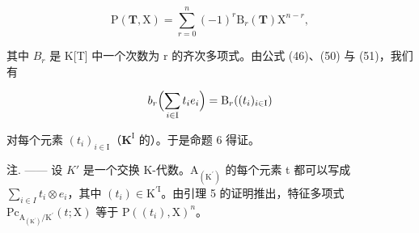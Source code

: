 \[
\mathrm{P} (\mathbf {T}, \mathrm{X}) = \sum_ {r = 0} ^ {n} (- 1) ^ {r} \mathrm{B} _ {r} (\mathbf {T}) \mathrm{X} ^ {n - r},\tag{51}
\]

其中 \(B_{r}\) 是 K{[}T{]} 中一个次数为 r 的齐次多项式。由公式 (46)、(50) 与 (51)，我们有

\[
b _ {r} \Bigl (\sum_ {i \in \mathrm{I}} t _ {i} e _ {i} \Bigr) = \mathrm{B} _ {r} ((t _ {i}) _ {i \in \mathrm{I}})
\]

对每个元素 \((t_i)_{i\in \mathrm{I}}\)（\(\mathbf{K}^{\mathrm{I}}\) 的）。于是命题 6 得证。

注. —— 设 \(K'\) 是一个交换 K-代数。\(\mathrm{A}_{(\mathrm{K}^{\prime})}\) 的每个元素 t 都可以写成 \(\sum_{i\in I}t_{i}\otimes e_{i}\)，其中 \((t_{i})\in\mathrm{K}^{\prime\mathrm{I}}\)。由引理 5 的证明推出，特征多项式 \(\mathrm{Pc}_{\mathrm{A}_{(\mathrm{K}^{\prime})}/\mathrm{K}^{\prime}}(t;\mathrm{X})\) 等于 \(\mathrm{P}((t_{i}),\mathrm{X})^{n}\)。
\relax{}
